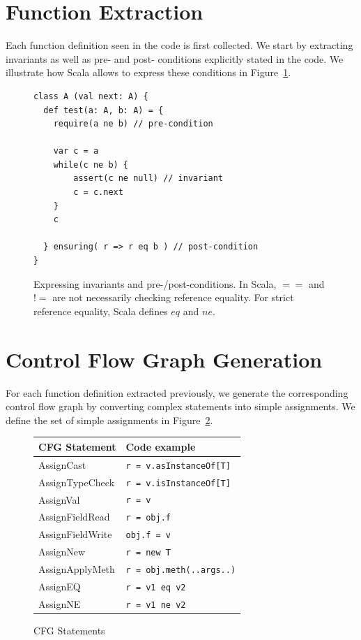 \section{Function Extraction}
Each function definition seen in the code is first collected. We start by
extracting invariants as well as pre- and post- conditions explicitly stated in
the code. We illustrate how Scala allows to express these conditions in
Figure~\ref{fig:fe:example1}.

\begin{figure}[h]
    \centering
\begin{lstlisting}
class A (val next: A) {
  def test(a: A, b: A) = {
    require(a ne b) // pre-condition

    var c = a
    while(c ne b) {
        assert(c ne null) // invariant
        c = c.next
    }
    c

  } ensuring( r => r eq b ) // post-condition
}
\end{lstlisting}
    \caption{Expressing invariants and pre-/post-conditions. In Scala, $==$ and
    $!=$ are not necessarily checking reference equality. For strict
    reference equality, Scala defines $eq$ and $ne$.}
    \label{fig:fe:example1}
\end{figure}

\section{Control Flow Graph Generation}
For each function definition extracted previously, we generate the
corresponding control flow graph by converting complex statements into simple
assignments. We define the set of simple assignments in
Figure~\ref{fig:cfg:statements}.

\FloatBarrier
\begin{figure}[h]
    \centering

    \begin{tabular}{ l | l }
        CFG Statement               & Code example \\
        \hline
        AssignCast       & \verb/r = v.asInstanceOf[T]/  \\
        AssignTypeCheck  & \verb/r = v.isInstanceOf[T]/  \\
        AssignVal        & \verb/r = v/  \\
        AssignFieldRead  & \verb/r = obj.f/  \\
        AssignFieldWrite & \verb/obj.f = v/  \\
        AssignNew        & \verb/r = new T/  \\
        AssignApplyMeth  & \verb/r = obj.meth(..args..)/  \\
        AssignEQ         & \verb/r = v1 eq v2/  \\
        AssignNE         & \verb/r = v1 ne v2/  \\
    \end{tabular}

    \caption{CFG Statements}
    \label{fig:cfg:statements}
\end{figure}

